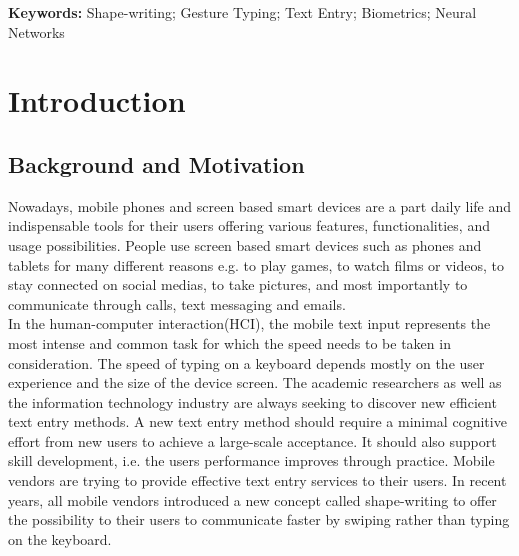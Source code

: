\documentclass[11pt,oneside,a4paper,openright]{book}
\begin{document}
\vspace{1em}
\textbf{Keywords:} Shape-writing; Gesture Typing; Text Entry; Biometrics; Neural Networks

\tableofcontents\newpage

\listoffigures\newpage

\listoftables\newpage



\chapter{Introduction}


\section{Background and Motivation}
Nowadays, mobile phones and screen based smart devices are a part daily life and indispensable tools for their users offering various features, functionalities, and usage possibilities. People use screen based smart devices such as phones and tablets for many different reasons e.g. to play games, to watch films or videos, to stay connected on social medias, to take pictures, and most importantly to communicate through calls, text messaging and emails.\\ %

In the human-computer interaction(HCI), the mobile text input represents the most intense and common task for which the speed needs to be taken in consideration. The speed of typing on a keyboard depends mostly on the user experience and the size of the device screen. The academic researchers as well as the information technology industry are always seeking to discover new efficient text entry methods. A new text entry method should require a minimal cognitive effort from new users to achieve a large-scale acceptance. It should also support skill development, i.e. the users performance improves through practice. Mobile vendors are trying to provide effective text entry services to their users. In recent years, all mobile vendors introduced a new concept called shape-writing to offer the possibility to their users to communicate faster by swiping rather than typing on the keyboard. \\
\end{document}
